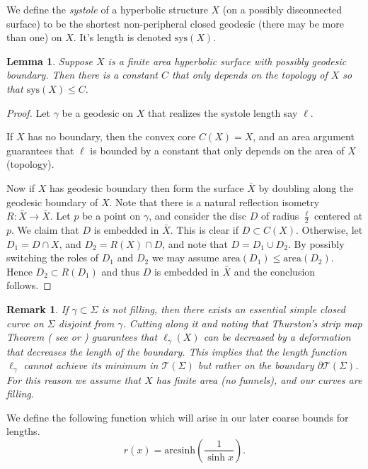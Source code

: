 \documentclass[12pt]{amsart}
\numberwithin{equation}{section}
\theoremstyle{plain}
\newtheorem{lem}[thm]{Lemma}
\newtheorem{rem}[thm]{Remark}
\begin{document}
 We define the {\it systole} of a hyperbolic structure $X$ (on a possibly disconnected surface) to be the shortest non-peripheral closed geodesic (there may be more than one) on $X$. It's length is denoted
 $\text{sys}(X)$.

 \begin{lem}
Suppose $X$ is a finite area hyperbolic surface with possibly geodesic boundary.
Then there is a constant $C$ that only depends on the topology of $X$ so that 
$\text{sys}(X) \leq C.$    
 \end{lem}

 \begin{proof}
Let $\gamma$ be a geodesic on $X$  that realizes the systole length say $\ell$.

If $X$ has no boundary, then 
the convex core $C(X)=X$, and an area argument guarantees that $\ell$ is bounded by a constant that only depends on the area of $X$ (topology).  

Now if $X$  has geodesic boundary
then form the  surface  $\bar{X}$ by doubling along the geodesic boundary of $X$. Note that there is a natural reflection isometry $R: \bar{X} \rightarrow \bar{X}$.
Let $p$ be a point on $\gamma$, and consider the disc $D$  of radius 
$\frac{\ell}{2}$ centered at $p$.
We claim that $D$ is embedded in $\bar{X}$. This is clear if
$D \subset C(X)$. Otherwise, let 
$D_{1}=D \cap X$, and $D_{2}=R(X)\cap D$, and note that $D=D_{1} \cup D_{2}$.  By possibly switching the roles of $D_{1}$ and $D_{2}$ we may assume 
$\text{area}(D_{1}) \leq 
\text{area}(D_{2})$. Hence  $D_{2} \subset R(D_{1})$ and thus  $D$ is embedded in $\bar{X}$ and the conclusion follows. 
 \end{proof}
 
 
 \begin{rem} \label{rem: not filling}
 If $\gamma \subset \Sigma$ is not filling, then there exists an
 essential  simple closed curve on $\Sigma$ disjoint from $\gamma$. Cutting along it and noting that Thurston's strip map Theorem 
 ( see \cite{ParlierlengthRiemann} or \cite{thurston1998minimal}) guarantees that 
 $\ell_{\gamma}(X)$ can be decreased by a deformation that decreases the length of the boundary. This implies that the length function
 $\ell_{\gamma}$ cannot achieve its minimum in $\mathcal{T}(\Sigma)$
 but rather on the boundary $\partial \mathcal{T}(\Sigma)$. For this reason we assume  that $X$ has finite area (no funnels), and our curves are filling.
 \end{rem}
 
 We define the following function which will arise in our later coarse bounds for lengths. 
 $$
 r(x)=\text{arcsinh}\left(\frac{1}{\sinh x} \right).
 $$
 
\end{document}
